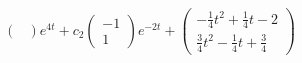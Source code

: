 \documentclass{article}
\begin{document}
\begin{align*}
\begin{pmatrix}
                           \end{pmatrix} e^{4 t} + c_2 \begin{pmatrix}
                                                         -1 \\
                                                         1
                                                       \end{pmatrix} e^{-2 t} + \begin{pmatrix}
                                                                                  -\frac{1}{4} t^2 + \frac{1}{4} t - 2 \\
                                                                                  \frac{3}{4} t^2 - \frac{1}{4} t + \frac{3}{4}
                                                                                \end{pmatrix}
\end{align*}

\setcounter{subsubsection}{4}
\subsubsection{}
\end{document}
